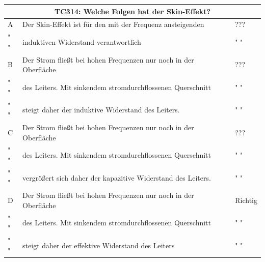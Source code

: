 \begin{frame}
	\begin{scriptsize}
	\begin{tabular}{|l|l|l|}
	\hline
		\multicolumn{3}{|c|}{\textbf{TC314:} Welche Folgen hat der Skin-Effekt?}\\
		\hline
		A & Der Skin-Effekt ist für den mit der Frequenz ansteigenden  & ??? \\
		" " & induktiven Widerstand verantwortlich  & " "\\ \hline
		
		B & Der Strom fließt bei hohen Frequenzen nur noch in der Oberfläche & ??? \\
		" " &des Leiters. Mit sinkendem stromdurchflossenen Querschnitt& " "\\
		" " & steigt daher der induktive Widerstand des Leiters.  & " "\\ \hline
		
		C & Der Strom fließt bei hohen Frequenzen nur noch in der Oberfläche& ??? \\
		" " & des  Leiters. Mit sinkendem stromdurchflossenen Querschnitt&" "\\
		" " & vergrößert  sich daher der kapazitive Widerstand des Leiters. &" "\\ \hline
		
		D &Der Strom fließt bei hohen Frequenzen nur noch in der Oberfläche& Richtig \\
		" " & des Leiters. Mit sinkendem stromdurchflossenen Querschnitt& " "\\
		" " & steigt daher der effektive Widerstand des Leiters& " "\\ \hline
	\end{tabular}
	\end{scriptsize}
\end{frame}

